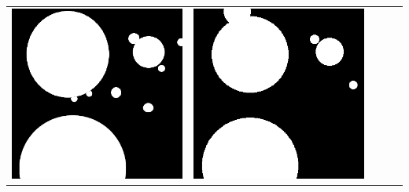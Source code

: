 \begin{table}[h!]
\begin{tabularx}{\textwidth}{>{\centering}m{}
			>{\centering}m{}
			>{\centering}m{}
			>{\centering}m{}
			>{\centering\arraybackslash}m{}}
		\includegraphics[width=0.9\linewidth]{images/gen/results_robbins/postprocessing/thm_dir_N-30_210.png_tile_60.png} &
		\includegraphics[width=0.9\linewidth]{images/gen/results_robbins/gt/thm_dir_N-30_210.png_tile_60.png} \\
		

\end{tabularx}
\end{table}

